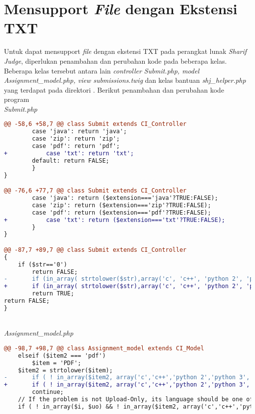 \section{Mensupport \textit{File} dengan Ekstensi TXT}
Untuk dapat mensupport \textit{file} dengan ekstensi TXT pada perangkat lunak \textit{Sharif Judge}, diperlukan penambahan dan perubahan kode pada beberapa kelas. Beberapa kelas tersebut antara lain \textit{controller Submit.php, model Assignment\_model.php, view submissions.twig} dan kelas bantuan \textit{shj\_helper.php} yang terdapat pada direktori . Berikut penambahan dan perubahan kode program
~\\
\textit{Submit.php}
\begin{lstlisting}[language=diff, basicstyle=\ttfamily, frame=single,
columns=fullflexible, keepspaces=true, breaklines=true]
@@ -58,6 +58,7 @@ class Submit extends CI_Controller
		case 'java': return 'java';
		case 'zip': return 'zip';
		case 'pdf': return 'pdf';
+       	case 'txt': return 'txt';
		default: return FALSE;
		}
}

@@ -76,6 +77,7 @@ class Submit extends CI_Controller
		case 'java': return ($extension==='java'?TRUE:FALSE);
		case 'zip': return ($extension==='zip'?TRUE:FALSE);
		case 'pdf': return ($extension==='pdf'?TRUE:FALSE);
+       	case 'txt': return ($extension==='txt'?TRUE:FALSE);
		}
}

@@ -87,7 +89,7 @@ class Submit extends CI_Controller
{
	if ($str=='0')
		return FALSE;
-   	if (in_array( strtolower($str),array('c', 'c++', 'python 2', 'python 3', 'java', 'zip', 'pdf')))
+   	if (in_array( strtolower($str),array('c', 'c++', 'python 2', 'python 3', 'java', 'zip', 'pdf', 'txt')))
		return TRUE;
return FALSE;
}
\end{lstlisting}
~\\
\textit{Assignment\_model.php}
\begin{lstlisting}[language=diff, basicstyle=\ttfamily, frame=single,
columns=fullflexible, keepspaces=true, breaklines=true]
@@ -98,7 +98,7 @@ class Assignment_model extends CI_Model
	elseif ($item2 === 'pdf')
		$item = 'PDF';
	$item2 = strtolower($item);
-   	if ( ! in_array($item2, array('c','c++','python 2','python 3','java','zip','pdf')))
+   	if ( ! in_array($item2, array('c','c++','python 2','python 3','java','zip','pdf','txt')))
		continue;
	// If the problem is not Upload-Only, its language should be one of {C,C++,Python 2, Python 3,Java}
	if ( ! in_array($i, $uo) && ! in_array($item2, array('c','c++','python 2','python 3','java')) )
\end{lstlisting}
